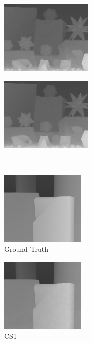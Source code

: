 \documentclass[preprint,10pt,5p,times,twocolumn]{elsarticle}
\begin{document}
\begin{figure}
\begin{subfigure}[b]{0.24\textwidth}
\end{subfigure}
\begin{subfigure}[b]{0.24\textwidth}
\includegraphics[height= 3.5cm, width=\textwidth]{fig_moebius_8X_noise_cvpr.png}
\end{subfigure}
\begin{subfigure}[b]{0.24\textwidth}
\includegraphics[height= 3.5cm, width=\textwidth]{fig_moebius_8X_noise_iccv.png}
\end{subfigure}
\\ \vspace{0.1cm}
\begin{subfigure}[b]{0.24\textwidth}
\includegraphics[height= 3.5cm, width=\textwidth]{fig_plastic.png}
\caption*{Ground Truth}
\end{subfigure}
\begin{subfigure}[b]{0.24\textwidth}
\includegraphics[height= 3.5cm, width=\textwidth]{fig_plastic_8X_noise_lqdai.png}
\caption*{CS{1}}
\end{subfigure}
\begin{subfigure}[b]{0.24\textwidth}

\end{subfigure}
\end{figure}
\end{document}
